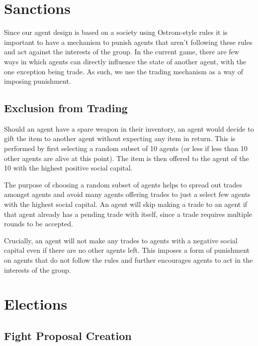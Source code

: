 \section{Sanctions}
Since our agent design is based on a society using Ostrom-style rules it is important to have a mechanism to punish agents that aren't following these rules and act against the interests of the group. In the current game, there are few ways in which agents can directly influence the state of another agent, with the one exception being trade. As such, we use the trading mechanism as a way of imposing punishment.

\subsection{Exclusion from Trading}

Should an agent have a spare weapon in their inventory, an agent would decide to gift the item to another agent without expecting any item in return. This is performed by first selecting a random subset of 10 agents (or less if less than 10 other agents are alive at this point). The item is then offered to the agent of the 10 with the highest positive social capital.

The purpose of choosing a random subset of agents helps to spread out trades amongst agents and avoid many agents offering trades to just a select few agents with the highest social capital. An agent will skip making a trade to an agent if that agent already has a pending trade with itself, since a trade requires multiple rounds to be accepted.

Crucially, an agent will not make any trades to agents with a negative social capital even if there are no other agents left. This imposes a form of punishment on agents that do not follow the rules and further encourages agents to act in the interests of the group.

\section{Elections}

\subsection{Fight Proposal Creation}

